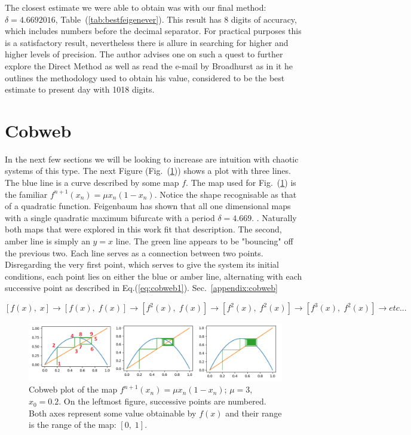 The closest estimate we were able to obtain was with our final method: $\delta = 4.6692016$, Table~(\ref{tab:bestfeigenever}). 
This result has 8 digits of accuracy,
which includes numbers before the decimal separator. For practical purposes this is a satisfactory result, nevertheless 
there is allure in searching for higher and higher levels of precision. The author advises one on such a quest to further explore
the Direct Method as well as read the e-mail by Broadhurst \cite{Broadhurst} as in it he outlines the methodology used to obtain
his value, considered to be the best estimate to present day with 1018 digits.

\newpage
\section{Cobweb}

In the next few sections we will be looking to increase are intuition with chaotic systems of this type.
The next Figure (Fig.~(\ref{fig:cobweb1})) shows a plot with three lines. The blue line is a curve described by some map $f$.
The map used for Fig.~(\ref{fig:cobweb1}) is the familiar $f^{n+1}(x_n)=\mu x_n (1-x_n)$. Notice the shape recognisable as
that of a quadratic function. Feigenbaum has shown that all one dimensional maps with a single quadratic maximum bifurcate
with a period $\delta = 4.669$. \cite{feigenbaumconstant}. Naturally both maps that were explored in this work fit that description.
The second, amber line is simply an $y=x$ line. The green line appears to be "bouncing" off the previous two. Each line serves as 
a connection between two points. Disregarding the very first point, which serves to give the system its initial conditions, each point
lies on either the blue or amber line, alternating with each successive point as described in Eq.(\ref{eq:cobweb1}).
Sec.~\ref{appendix:cobweb}

\begin{equation}
    \label{eq:cobweb1}
    [f(x),\;x] \to [f(x),\;f(x)] \to [f^2(x),\;f(x)] \to [f^2(x),\;f^2(x)] \to [f^3(x),\;f^2(x)] \to etc...
\end{equation}

\begin{figure}[h]
    \centering
    \includegraphics[width=1\textwidth]{Images/cobweb4.png}
    \caption{Cobweb plot of the map $f^{n+1}(x_n)=\mu x_n (1-x_n)$; $\mu = 3$, $x_0 = 0.2$. On the leftmost figure, successive points are numbered. Both axes 
    represent some value obtainable by $f(x)$ and their range is the range of the map: $[0,\;1]$.}
    \label{fig:cobweb1}
\end{figure}

